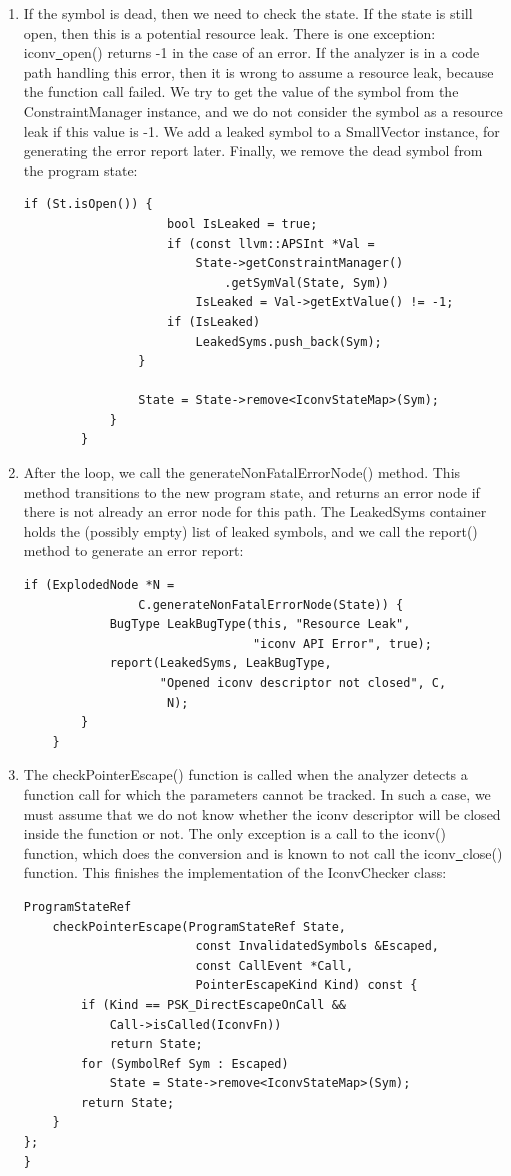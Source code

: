 \begin{enumerate}
\item If the symbol is dead, then we need to check the state. If the state is still open, then this is a potential resource leak. There is one exception: iconv\underline{~}open() returns -1 in the case of an error. If the analyzer is in a code path handling this error, then it is wrong to assume a resource leak, because the function call failed. We try to get the value of the symbol from the ConstraintManager instance, and we do not consider the symbol as a resource leak if this value is -1. We add a leaked symbol to a SmallVector instance, for generating the error report later. Finally, we remove the dead symbol from the program state:
\begin{lstlisting}[caption={}]
				if (St.isOpen()) {
					bool IsLeaked = true;
					if (const llvm::APSInt *Val =
						State->getConstraintManager()
							.getSymVal(State, Sym))
						IsLeaked = Val->getExtValue() != -1;
					if (IsLeaked)
						LeakedSyms.push_back(Sym);
				}
			
				State = State->remove<IconvStateMap>(Sym);
			}
		}
\end{lstlisting}

\item After the loop, we call the generateNonFatalErrorNode() method. This method transitions to the new program state, and returns an error node if there is not already an error node for this path. The LeakedSyms container holds the (possibly empty) list of leaked symbols, and we call the report() method to generate an error report:
\begin{lstlisting}[caption={}]
		if (ExplodedNode *N =
				C.generateNonFatalErrorNode(State)) {
			BugType LeakBugType(this, "Resource Leak",
								"iconv API Error", true);
			report(LeakedSyms, LeakBugType,
				   "Opened iconv descriptor not closed", C,
					N);
		}
	}
\end{lstlisting}

\item The checkPointerEscape() function is called when the analyzer detects a function call for which the parameters cannot be tracked. In such a case, we must assume that we do not know whether the iconv descriptor will be closed inside the function or not. The only exception is a call to the iconv() function, which does the conversion and is known to not call the iconv\underline{~}close() function. This finishes the implementation of the IconvChecker class:
\begin{lstlisting}[caption={}]
	ProgramStateRef
	checkPointerEscape(ProgramStateRef State,
						const InvalidatedSymbols &Escaped,
						const CallEvent *Call,
						PointerEscapeKind Kind) const {
		if (Kind == PSK_DirectEscapeOnCall &&
			Call->isCalled(IconvFn))
			return State;
		for (SymbolRef Sym : Escaped)
			State = State->remove<IconvStateMap>(Sym);
		return State;
	}
};
}
\end{lstlisting}


\end{enumerate}
